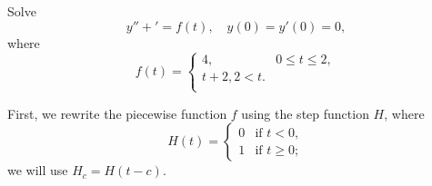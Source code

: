 \documentclass[../hw7]{subfiles}
\begin{document}
Solve \[y''+'=f(t), \quad y(0)=y'(0)=0,\] where \[f(t)=\begin{cases}
    4, & 0\leq t \leq 2, \\
    t+2, 2<t. \\
\end{cases}\]

First, we rewrite the piecewise function $f$ using the step function $H$, where
\[H(t) = \begin{cases} 
    0 & \text{if } t < 0,\\
    1 & \text{if } t \geq 0;
\end{cases}
\] we will use $H_c=H(t-c)$.
\end{document}
